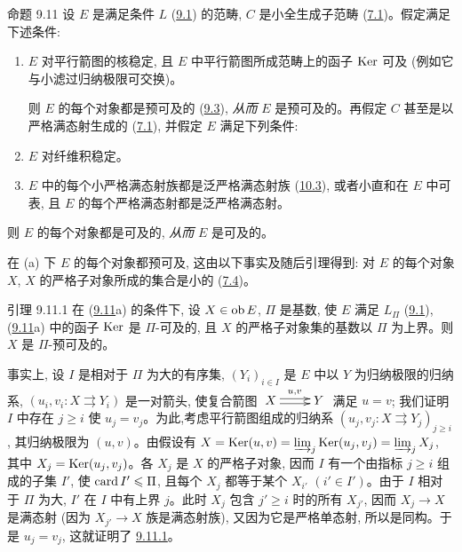 
\begin{enonce*}{命题 9.11}
设 $E$ 是满足条件 $L$ (\hyperref[I.def9.1]{9.1}) 的范畴, $C$ 是小全生成子范畴 (\hyperref[I.def7.1]{7.1})。假定满足下述条件:
\begin{enumerate}
\renewcommand{\theenumi}{\alph{enumi}}
\renewcommand{\labelenumi}{\theenumi)}
\item $E$ 对平行箭图的核稳定, 且 $E$ 中平行箭图所成范畴上的函子 $\operatorname{Ker}$ 可及 (例如它\pageoriginale 与小滤过归纳极限可交换)。

则 $E$ 的每个对象都是预可及的 (\hyperref[I.def9.3]{9.3}), \textit{从而} $E$ 是预可及的。再假定 $C$ 甚至是以严格满态射生成的 (\hyperref[I.def7.1]{7.1}), 并假定 $E$ 满足下列条件:

\item $E$ 对纤维积稳定。

\item $E$ 中的每个小严格满态射族都是泛严格满态射族 (\hyperref[I.sec10.3]{10.3}), 或者小直和在 $E$ 中可表, 且 $E$ 的每个严格满态射都是泛严格满态射。
\end{enumerate}

则 $E$ 的每个对象都是可及的, \textit{从而} $E$ 是可及的。
\end{enonce*}

在 (a) 下 $E$ 的每个对象都预可及, 这由以下事实及随后引理得到: 对 $E$ 的每个对象 $X$, $X$ 的严格子对象所成的集合是小的 (\hyperref[I.prop7.4]{7.4})。

\begin{enonce*}{引理 9.11.1}
在 (\hyperref[I.prop9.11]{9.11}a) 的条件下, 设 $X\in\operatorname{ob} E$, $\Pi$ 是基数, 使 $E$ 满足 $L_{\Pi}$ (\hyperref[I.def9.1]{9.1}), (\hyperref[I.prop9.11]{9.11}a) 中的函子 $\operatorname{Ker}$ 是 $\Pi$-可及的, 且 $X$ 的严格子对象集的基数以 $\Pi$ 为上界。则 $X$ 是 $\Pi$-预可及的。
\end{enonce*}

事实上, 设 $I$ 是相对于 $\Pi$ 为大的有序集, $(Y_i)_{i\in I}$ 是 $E$ 中以 $Y$ 为归纳极限的归纳系, $(u_i,v_i:X\rightrightarrows Y_i)$ 是一对箭头, 使复合箭图 $ \xymatrix{ X \ar@<2pt>[r]^{u,v} \ar@<-2pt>[r]& Y }$ 满足 $u=v$; 我们证明 $I$ 中存在 $j\geq i$ 使 $u_j=v_j$。为此,\pageoriginale 考虑平行箭图组成的归纳系 $(u_j,v_j:X\rightrightarrows Y_j)_{j\geq i}$, 其归纳极限为 $(u,v)$。由假设有 $X=\operatorname{Ker}(u,v)=\varinjlim_j\operatorname{Ker}(u_j,v_j)=\varinjlim_jX_j$, 其中 $X_j=\operatorname{Ker}(u_j,v_j)$。各 $X_j$ 是 $X$ 的严格子对象, 因而 $I$ 有一个由指标 $j\geq i$ 组成的子集 $I'$, 使 $\operatorname{card} I'\leqslant\Pi$, 且每个 $X_j$ 都等于某个 $X_{i'}$ $(i'\in I')$。由于 $I$ 相对于 $\Pi$ 为大, $I'$ 在 $I$ 中有上界 $j$。此时 $X_j$ 包含 $j'\geq i$ 时的所有 $X_{j'}$, 因而 $X_j\rightarrow X$ 是满态射 (因为 $X_{j'}\rightarrow X$ 族是满态射族), 又因为它是严格单态射, 所以是同构。于是 $u_j=v_j$, 这就证明了 \hyperref[I.lem9.11.1]{9.11.1}。

